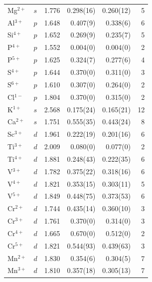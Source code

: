 \begin{longtable}{l l r r r r}
  Mg$^{2+}$            & $s$   & 1.776 &      0.298(16) &      0.260(12) & 5 \\
  Al$^{3+}$            & $p$   & 1.648 &       0.407(9) &       0.338(6) & 6 \\
  Si$^{4+}$            & $p$   & 1.652 &       0.269(9) &       0.235(7) & 5 \\
  P$^{4+}$             & $p$   & 1.552 &       0.004(0) &       0.004(0) & 2 \\
  P$^{5+}$             & $p$   & 1.625 &       0.324(7) &       0.277(6) & 4 \\
  S$^{4+}$             & $p$   & 1.644 &       0.370(0) &       0.311(0) & 3 \\
  S$^{6+}$             & $p$   & 1.610 &       0.307(0) &       0.264(0) & 2 \\
  Cl$^{1-}$            & $p$   & 1.804 &       0.370(0) &       0.315(0) & 2 \\
  K$^{1+}$             & $s$   & 2.568 &      0.175(24) &      0.165(21) & 12 \\
  Ca$^{2+}$            & $s$   & 1.751 &      0.555(35) &      0.443(24) & 8 \\
  Sc$^{3+}$            & $d$   & 1.961 &      0.222(19) &      0.201(16) & 6 \\
  Ti$^{3+}$            & $d$   & 2.009 &       0.080(0) &       0.077(0) & 2 \\
  Ti$^{4+}$            & $d$   & 1.881 &      0.248(43) &      0.222(35) & 6 \\
  V$^{3+}$             & $d$   & 1.782 &      0.375(22) &      0.318(16) & 6 \\
  V$^{4+}$             & $d$   & 1.821 &      0.353(15) &      0.303(11) & 5 \\
  V$^{5+}$             & $d$   & 1.849 &      0.448(75) &      0.373(53) & 6 \\
  Cr$^{2+}$            & $d$   & 1.744 &      0.435(14) &      0.360(10) & 3 \\
  Cr$^{3+}$            & $d$   & 1.761 &       0.370(0) &       0.314(0) & 3 \\
  Cr$^{4+}$            & $d$   & 1.665 &       0.670(0) &       0.512(0) & 2 \\
  Cr$^{5+}$            & $d$   & 1.821 &      0.544(93) &      0.439(63) & 3 \\
  Mn$^{2+}$            & $d$   & 1.830 &       0.354(6) &       0.304(5) & 7 \\
  Mn$^{3+}$            & $d$   & 1.810 &      0.357(18) &      0.305(13) & 7 \\

\end{longtable}
